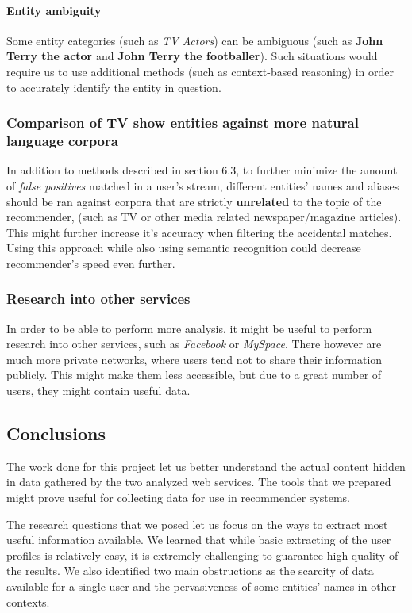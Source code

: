 \paragraph{Entity ambiguity}

Some entity categories (such as \textit{TV Actors}) can be ambiguous (such as \textbf{John Terry the actor} and \textbf{John Terry the footballer}). Such situations
would require us to use additional methods (such as context-based reasoning) in order to accurately identify the entity in question.

\subsubsection{Comparison of TV show entities against more natural language corpora}

In addition to methods described in section 6.3, to further minimize the amount of \textit{false positives}
matched in a user's stream, different entities' names and aliases should be ran against corpora
that are strictly \textbf{unrelated} to the topic of the recommender, (such as TV or other media related
newspaper/magazine articles). This might further increase it's accuracy when filtering the accidental
matches. Using this approach while also using semantic recognition could decrease recommender's
speed even further.

\subsubsection{Research into other services}

In order to be able to perform more analysis, it might be useful to perform
research into other services, such as \textit{Facebook} or \textit{MySpace}.
There however are much more private networks, where users tend not to share
their information publicly. This might make them less accessible, but due to a
great number of users, they might contain useful data.

\subsection{Conclusions}

The work done for this project let us better understand the actual content
hidden in data gathered by the two analyzed web services. The tools that we
prepared might prove useful for collecting data for use in recommender systems.

The research questions that we posed let us focus on the ways to extract most
useful information available. We learned that while basic extracting of the
user profiles is relatively easy, it is extremely challenging to guarantee high
quality of the results. We also identified two main obstructions as the
scarcity of data available for a single user and the pervasiveness of some
entities' names in other contexts.
